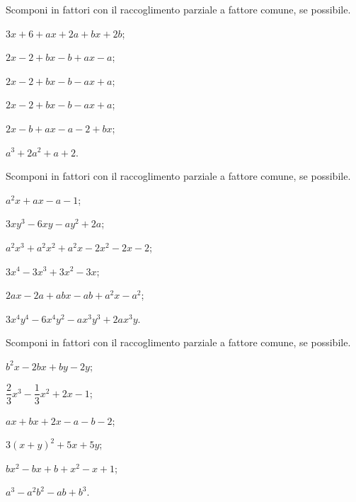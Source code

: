 \begin{esercizio}
\label{ese:13.15}
Scomponi in fattori con il raccoglimento parziale a fattore comune, se possibile.
\begin{multicols}{2}
\begin{enumeratea}
 \item $3x+6+ax+2a+bx+2b$;
 \item $2x-2+bx-b+ax-a$;
 \item $2x-2+bx-b-ax+a$;
 \item $2x-2+bx-b-ax+a$;
 \item $2x-b+ax-a-2+bx$;
 \item $a^{3}+2a^{2}+a+2$.
\end{enumeratea}
\end{multicols}
\end{esercizio}

\begin{esercizio}
\label{ese:13.16}
Scomponi in fattori con il raccoglimento parziale a fattore comune, se possibile.
\begin{multicols}{2}
\begin{enumeratea}
 \item $a^{2}x+ax-a-1$;
 \item $3xy^{3}-6xy-ay^{2}+2a$;
 \item $a^{2}x^{3}+a^{2}x^{2}+a^{2}x-2x^{2}-2x-2$;
 \item $3x^{4}-3x^{3}+3x^{2}-3x$;
 \item $2ax-2a+abx-ab+a^{2}x-a^{2}$;
 \item $3x^{4}y^{4}-6x^{4}y^{2}-ax^{3}y^{3}+2ax^{3}y$.
\end{enumeratea}
\end{multicols}
\end{esercizio}

\begin{esercizio}[\Ast]
\label{ese:13.17}
Scomponi in fattori con il raccoglimento parziale a fattore comune, se possibile.
\begin{multicols}{2}
\begin{enumeratea}
 \item $b^{2}x-2bx+by-2y$;
 \item $\dfrac{2}{3}x^{3}-\dfrac{1}{3}x^{2}+2x-1$;
 \item $ax+bx+2x-a-b-2$;
 \item $3(x+y)^{2}+5x+5y$;
 \item $bx^{2}-bx+b+x^{2}-x+1$;
 \item $a^{3}-a^{2}b^{2}-ab+b^{3}$.
\end{enumeratea}
\end{multicols}
\end{esercizio}

